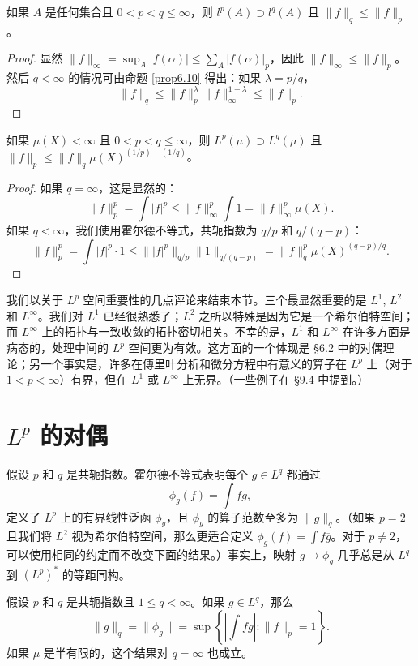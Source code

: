 \documentclass[lang=cn,10pt,thmcnt=section]{elegantbook}
\begin{document}
\begin{proposition}\label{prop6.11}
如果 $A$ 是任何集合且 $0 < p < q \le \infty$，则 $l^p(A) \supset l^q(A)$ 且 $\|f\|_q \le \|f\|_p$。
\end{proposition}
\begin{proof}
显然 $\|f\|_\infty = \sup_A |f(\alpha)| \le \sum_A |f(\alpha)|_p$，因此 $\|f\|_\infty \le \|f\|_p$。
然后 $q < \infty$ 的情况可由命题 \ref{prop6.10} 得出：如果 $\lambda=p/q$，
\[ \|f\|_q \le \|f\|_p^\lambda \|f\|_\infty^{1-\lambda} \le \|f\|_p. \]
\end{proof}

\begin{proposition}\label{prop6.12}
如果 $\mu(X) < \infty$ 且 $0 < p < q \le \infty$，则 $L^p(\mu) \supset L^q(\mu)$ 且 $\|f\|_p \le \|f\|_q \mu(X)^{(1/p)-(1/q)}$。
\end{proposition}
\begin{proof}
如果 $q=\infty$，这是显然的：
\[ \|f\|_p^p = \int |f|^p \le \|f\|_\infty^p \int 1 = \|f\|_\infty^p \mu(X). \]
如果 $q < \infty$，我们使用霍尔德不等式，共轭指数为 $q/p$ 和 $q/(q-p)$：
\[ \|f\|_p^p = \int |f|^p \cdot 1 \le \| |f|^p \|_{q/p} \|1\|_{q/(q-p)} = \|f\|_q^p \mu(X)^{(q-p)/q}. \]
\end{proof}

我们以关于 $L^p$ 空间重要性的几点评论来结束本节。三个最显然重要的是 $L^1$, $L^2$ 和 $L^\infty$。我们对 $L^1$ 已经很熟悉了；$L^2$ 之所以特殊是因为它是一个希尔伯特空间；而 $L^\infty$ 上的拓扑与一致收敛的拓扑密切相关。不幸的是，$L^1$ 和 $L^\infty$ 在许多方面是病态的，处理中间的 $L^p$ 空间更为有效。这方面的一个体现是 §6.2 中的对偶理论；另一个事实是，许多在傅里叶分析和微分方程中有意义的算子在 $L^p$ 上（对于 $1 < p < \infty$）有界，但在 $L^1$ 或 $L^\infty$ 上无界。（一些例子在 §9.4 中提到。）

\section{ $L^p$ 的对偶}

假设 $p$ 和 $q$ 是共轭指数。霍尔德不等式表明每个 $g \in L^q$ 都通过
\[ \phi_g(f) = \int fg, \]
定义了 $L^p$ 上的有界线性泛函 $\phi_g$，且 $\phi_g$ 的算子范数至多为 $\|g\|_q$。（如果 $p=2$ 且我们将 $L^2$ 视为希尔伯特空间，那么更适合定义 $\phi_g(f) = \int f\overline{g}$。对于 $p \neq 2$，可以使用相同的约定而不改变下面的结果。）事实上，映射 $g \to \phi_g$ 几乎总是从 $L^q$ 到 $(L^p)^*$ 的等距同构。

\begin{proposition}\label{prop6.13}
假设 $p$ 和 $q$ 是共轭指数且 $1 \leq q < \infty$。如果 $g \in L^q$，那么
\[ \|g\|_q = \|\phi_g\| = \sup\left\{\left|\int fg\right| : \|f\|_p = 1\right\}. \]
如果 $\mu$ 是半有限的，这个结果对 $q = \infty$ 也成立。
\end{proposition}
\end{document}
